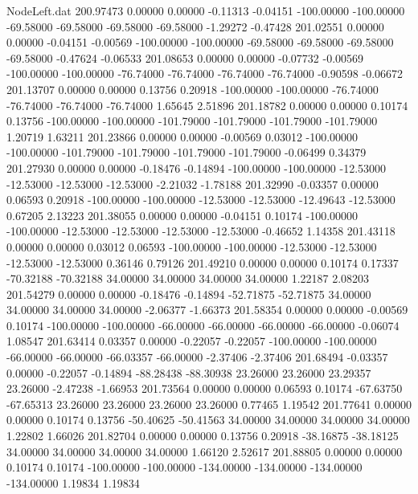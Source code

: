 \begin{filecontents}{NodeLeft.dat}
 200.97473    0.00000    0.00000    -0.11313   -0.04151 -100.00000 -100.00000  -69.58000  -69.58000  -69.58000  -69.58000   -1.29272   -0.47428
 201.02551    0.00000    0.00000    -0.04151   -0.00569 -100.00000 -100.00000  -69.58000  -69.58000  -69.58000  -69.58000   -0.47624   -0.06533
 201.08653    0.00000    0.00000    -0.07732   -0.00569 -100.00000 -100.00000  -76.74000  -76.74000  -76.74000  -76.74000   -0.90598   -0.06672
 201.13707    0.00000    0.00000     0.13756    0.20918 -100.00000 -100.00000  -76.74000  -76.74000  -76.74000  -76.74000    1.65645    2.51896
 201.18782    0.00000    0.00000     0.10174    0.13756 -100.00000 -100.00000 -101.79000 -101.79000 -101.79000 -101.79000    1.20719    1.63211
 201.23866    0.00000    0.00000    -0.00569    0.03012 -100.00000 -100.00000 -101.79000 -101.79000 -101.79000 -101.79000   -0.06499    0.34379
 201.27930    0.00000    0.00000    -0.18476   -0.14894 -100.00000 -100.00000  -12.53000  -12.53000  -12.53000  -12.53000   -2.21032   -1.78188
 201.32990   -0.03357    0.00000     0.06593    0.20918 -100.00000 -100.00000  -12.53000  -12.53000  -12.49643  -12.53000    0.67205    2.13223
 201.38055    0.00000    0.00000    -0.04151    0.10174 -100.00000 -100.00000  -12.53000  -12.53000  -12.53000  -12.53000   -0.46652    1.14358
 201.43118    0.00000    0.00000     0.03012    0.06593 -100.00000 -100.00000  -12.53000  -12.53000  -12.53000  -12.53000    0.36146    0.79126
 201.49210    0.00000    0.00000     0.10174    0.17337  -70.32188  -70.32188   34.00000   34.00000   34.00000   34.00000    1.22187    2.08203
 201.54279    0.00000    0.00000    -0.18476   -0.14894  -52.71875  -52.71875   34.00000   34.00000   34.00000   34.00000   -2.06377   -1.66373
 201.58354    0.00000    0.00000    -0.00569    0.10174 -100.00000 -100.00000  -66.00000  -66.00000  -66.00000  -66.00000   -0.06074    1.08547
 201.63414    0.03357    0.00000    -0.22057   -0.22057 -100.00000 -100.00000  -66.00000  -66.00000  -66.03357  -66.00000   -2.37406   -2.37406
 201.68494   -0.03357    0.00000    -0.22057   -0.14894  -88.28438  -88.30938   23.26000   23.26000   23.29357   23.26000   -2.47238   -1.66953
 201.73564    0.00000    0.00000     0.06593    0.10174  -67.63750  -67.65313   23.26000   23.26000   23.26000   23.26000    0.77465    1.19542
 201.77641    0.00000    0.00000     0.10174    0.13756  -50.40625  -50.41563   34.00000   34.00000   34.00000   34.00000    1.22802    1.66026
 201.82704    0.00000    0.00000     0.13756    0.20918  -38.16875  -38.18125   34.00000   34.00000   34.00000   34.00000    1.66120    2.52617
 201.88805    0.00000    0.00000     0.10174    0.10174 -100.00000 -100.00000 -134.00000 -134.00000 -134.00000 -134.00000    1.19834    1.19834

\end{filecontents}
